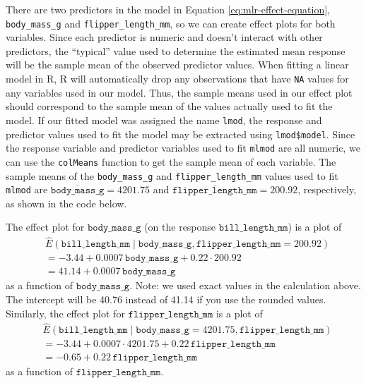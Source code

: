 \documentclass[
]{book}
\newenvironment{Shaded}{\begin{snugshade}}{\end{snugshade}}
\newcommand{\DocumentationTok}[1]{\textcolor[rgb]{0.56,0.35,0.01}{\textbf{\textit{#1}}}}
\newcommand{\FunctionTok}[1]{\textcolor[rgb]{0.00,0.00,0.00}{#1}}
\newcommand{\NormalTok}[1]{#1}
\newcommand{\SpecialCharTok}[1]{\textcolor[rgb]{0.00,0.00,0.00}{#1}}
\theoremstyle{definition}
\theoremstyle{definition}
\theoremstyle{definition}
\theoremstyle{definition}
\theoremstyle{remark}
\begin{document}
There are two predictors in the model in Equation
\eqref{eq:mlr-effect-equation}, \texttt{body\_mass\_g} and \texttt{flipper\_length\_mm}, so
we can create effect plots for both variables. Since each predictor is
numeric and doesn't interact with other predictors, the ``typical'' value
used to determine the estimated mean response will be the sample mean of
the observed predictor values. When fitting a linear model in R, R will
automatically drop any observations that have \texttt{NA} values for any
variables used in our model. Thus, the sample means used in our effect
plot should correspond to the sample mean of the values actually used to
fit the model. If our fitted model was assigned the name \texttt{lmod}, the
response and predictor values used to fit the model may be extracted
using \texttt{lmod\$model}. Since the response variable and predictor variables
used to fit \texttt{mlmod} are all numeric, we can use the \texttt{colMeans} function
to get the sample mean of each variable. The sample means of the
\texttt{body\_mass\_g} and \texttt{flipper\_length\_mm} values used to fit \texttt{mlmod} are
\(\overline{\mathtt{body\_mass\_g}}=4201.75\) and
\(\overline{\mathtt{flipper\_length\_mm}}=200.92\), respectively, as shown
in the code below.

\begin{Shaded}
\end{Shaded}

The effect plot for \(\mathtt{body\_mass\_g}\) (on the response
\(\mathtt{bill\_length\_mm}\)) is a plot of \[
\begin{aligned}
&\hat{E}(\mathtt{bill\_length\_mm}\mid \mathtt{body\_mass\_g}, \mathtt{flipper\_length\_mm} = 200.92)\\
&=-3.44+0.0007 \,\mathtt{body\_mass\_g}+0.22\cdot 200.92 \\
&=41.14+0.0007 \,\mathtt{body\_mass\_g}
\end{aligned}
\] as a function of \(\mathtt{body\_mass\_g}\). Note: we used exact values
in the calculation above. The intercept will be 40.76 instead of 41.14
if you use the rounded values. Similarly, the effect plot for
\(\mathtt{flipper\_length\_mm}\) is a plot of \[
\begin{aligned}
&\hat{E}(\mathtt{bill\_length\_mm}\mid \mathtt{body\_mass\_g} = 4201.75,\mathtt{flipper\_length\_mm}) \\
&=-3.44+0.0007 \cdot 4201.75+0.22\,\mathtt{flipper\_length\_mm} \\
&=-0.65 + 0.22\,\mathtt{flipper\_length\_mm}
\end{aligned}
\] as a function of \(\mathtt{flipper\_length\_mm}\).
\end{document}
